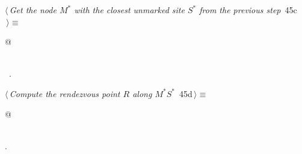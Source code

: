 \documentclass[11.5pt]{report}
\begin{document}
\vspace{-0.8cm}\newchunk
\begin{flushleft} \small
\begin{minipage}{\linewidth}\label{scrap64}\raggedright\small
{} $\langle\,${\itshape Get the node $M^{*}$ with the closest unmarked site $S^{*}$ from the previous step}\nobreak\ {\footnotesize {45c}}$\,\rangle\equiv$
\vspace{-1ex}
\begin{list}{}{} \item
\mbox{}\verb@   @\\
\mbox{}\verb@pass@\\
\mbox{}\verb@@{\NWsep}
\end{list}
\vspace{-1.5ex}
\footnotesize
\begin{list}{}{\setlength{\itemsep}{-\parsep}\setlength{\itemindent}{-\leftmargin}}
\item \NWtxtMacroRefIn\ .

\item{}
\end{list}
\end{minipage}\vspace{4ex}
\end{flushleft}

\vspace{-0.8cm} \newchunk
\begin{flushleft} \small
\begin{minipage}{\linewidth}\label{scrap65}\raggedright\small
{} $\langle\,${\itshape Compute the rendezvous point $R$ along $M^{*}S^{*}$}\nobreak\ {\footnotesize {45d}}$\,\rangle\equiv$
\vspace{-1ex}
\begin{list}{}{} \item
\mbox{}\verb@   @\\
\mbox{}\verb@pass@\\
\mbox{}\verb@@{\NWsep}
\end{list}
\vspace{-1.5ex}
\footnotesize
\begin{list}{}{\setlength{\itemsep}{-\parsep}\setlength{\itemindent}{-\leftmargin}}
\item {\NWtxtMacroNoRef}.

\item{}
\end{list}
\end{minipage}\vspace{4ex}
\end{flushleft}
\end{document}
